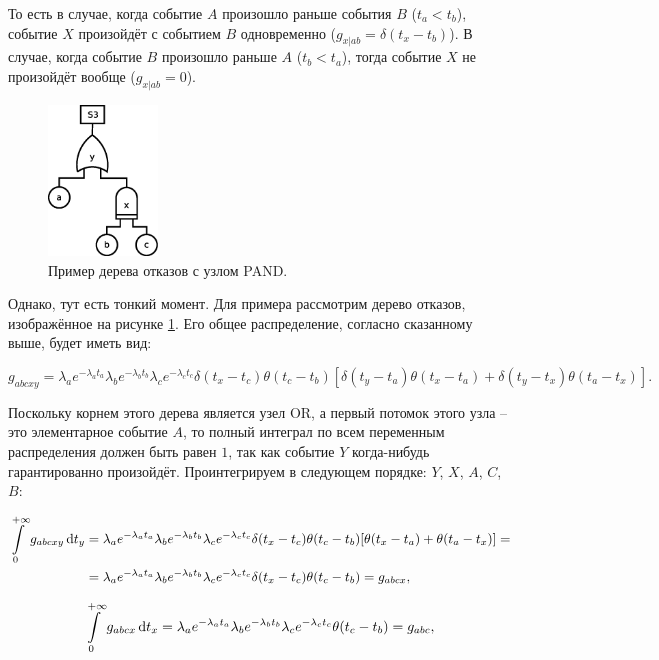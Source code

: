 \documentclass[a4paper, 12pt]{article}
\begin{document}
То есть в случае, когда событие $A$ произошло раньше события $B$ ($t_a < t_b$), событие $X$ произойдёт с событием $B$ одновременно ($g_{x|ab} = \delta(t_x - t_b)$). В случае, когда событие $B$ произошло раньше $A$ ($t_b < t_a$), тогда событие $X$ не произойдёт вообще ($g_{x|ab} = 0$).

\begin{figure}[p]
  \centering
  \includegraphics[height=4.0cm]{s3}
  \caption{Пример дерева отказов с узлом PAND.}
  \label{fig:dft1}
\end{figure}

Однако, тут есть тонкий момент. Для примера рассмотрим дерево отказов, изображённое на рисунке \ref{fig:dft1}. Его общее распределение, согласно сказанному выше, будет иметь вид:

\begin{equation*}
  g_{abcxy} = \lambda_a e^{-\lambda_a t_a} \lambda_b e^{-\lambda_b t_b}
  \lambda_c e^{-\lambda_c t_c} \delta(t_x - t_c) \theta(t_c - t_b)
  [\delta(t_y - t_a) \theta(t_x - t_a) + \delta(t_y - t_x) \theta(t_a - t_x)].
\end{equation*}

Поскольку корнем этого дерева является узел OR, а первый потомок этого узла -- это элементарное событие $A$, то полный интеграл по всем переменным распределения должен быть равен $1$, так как событие $Y$ когда-нибудь гарантированно произойдёт. Проинтегрируем в следующем порядке: $Y$, $X$, $A$, $C$, $B$:

\begin{align*}
  \int\limits_0^{+\infty} g_{abcxy} \dif t_y &= \lambda_a e^{-\lambda_a t_a}
  \lambda_b e^{-\lambda_b t_b} \lambda_c e^{-\lambda_c t_c}
  \delta(t_x - t_c) \theta(t_c - t_b) [\theta(t_x - t_a) + \theta(t_a - t_x)] = \\
  &= \lambda_a e^{-\lambda_a t_a} \lambda_b e^{-\lambda_b t_b}
  \lambda_c e^{-\lambda_c t_c} \delta(t_x - t_c) \theta(t_c - t_b) = g_{abcx},
\end{align*}

\begin{equation*}
  \int\limits_0^{+\infty} g_{abcx} \dif t_x = \lambda_a e^{-\lambda_a t_a}
  \lambda_b e^{-\lambda_b t_b} \lambda_c e^{-\lambda_c t_c} \theta(t_c - t_b) = g_{abc},
\end{equation*}
\end{document}

